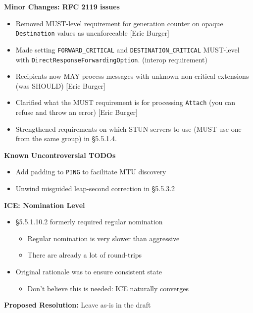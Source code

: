 \documentclass[helvetica]{seminar}
\newcommand{\heading}[1]{%
  \begin{center} 
    \large\bf 
    #1 
  \end{center} 
  \vspace{.4 in}}
\begin{document}
\begin{slide}
\heading{Minor Changes: RFC 2119 issues}

\begin{itemize}
\item Removed MUST-level requirement for generation counter on
  opaque \verb^Destination^ values as unenforceable [Eric Burger]
\item Made setting \verb^FORWARD_CRITICAL^ and \verb^DESTINATION_CRITICAL^
  MUST-level with \verb^DirectResponseForwardingOption^. (interop
  requirement)
\item Recipients now MAY process messages with unknown
  non-critical extensions (was SHOULD) [Eric Burger]
\item Clarified what the MUST requirement is for processing \verb^Attach^
  (you can refuse and throw an error) [Eric Burger]
\item Strengthened requirements on which STUN servers to use
  (MUST use one from the same group) in \S 5.5.1.4.
\end{itemize}
\end{slide}



\begin{slide}
\heading{Known Uncontroversial TODOs}

\begin{itemize}
\item Add padding to \verb^PING^ to facilitate MTU discovery
\item Unwind misguided leap-second correction in \S 5.5.3.2
\end{itemize}
\end{slide}


\begin{slide}
\heading{ICE: Nomination Level}

\begin{itemize}
\item \S 5.5.1.10.2 formerly required regular nomination
\begin{itemize}
\item Regular nomination is very slower than aggressive
\item There are already a lot of round-trips
\end{itemize}
\item Original rationale was to ensure consistent state
\begin{itemize}
\item Don't believe this is needed: ICE naturally converges
\end{itemize}
\end{itemize}
\vspace{1em}
\textbf{Proposed Resolution:} Leave as-is in the draft
\end{slide}
\end{document}
